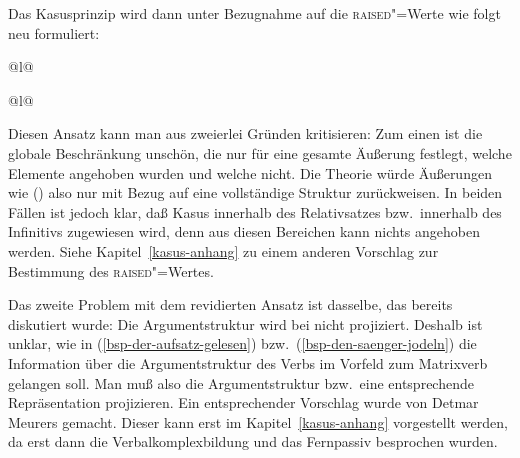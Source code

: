 Das Kasusprinzip wird dann unter Bezugnahme auf die \textsc{raised}"=Werte wie folgt neu formuliert:
\eal
\label{case-prz-zwei}
\ex \begin{tabular}[t]{@{}l@{}}
     \impl \\
    \mbox{}\hspace{3cm}
    \end{tabular}
\ex \begin{tabular}[t]{@{}l@{}}
     \impl \\
    \mbox{}\hspace{3cm}
    \end{tabular}
\zl
Diesen Ansatz kann man aus zweierlei Gründen kritisieren: Zum einen ist die globale Beschränkung
unschön, die nur für eine gesamte Äußerung festlegt, welche Elemente angehoben wurden und welche nicht.
Die Theorie würde Äußerungen wie () also nur mit Bezug auf eine vollständige Struktur zurückweisen.
\eal
{}
\zl
In beiden Fällen ist jedoch klar, daß Kasus innerhalb des Relativsatzes bzw.\
innerhalb des Infinitivs zugewiesen wird, denn aus diesen Bereichen kann nichts angehoben werden. 
Siehe Kapitel~\ref{kasus-anhang} zu einem anderen Vorschlag zur Bestimmung des \textsc{raised}"=Wertes.

Das zweite Problem mit dem revidierten Ansatz ist dasselbe, das bereits diskutiert
wurde: Die Argumentstruktur wird bei \prz nicht projiziert. Deshalb ist
unklar, wie in (\ref{bsp-der-aufsatz-gelesen}) bzw.\ (\ref{bsp-den-saenger-jodeln})
die Information über die Argumentstruktur des Verbs im Vorfeld zum
Matrixverb gelangen soll. Man muß also die Argumentstruktur bzw.\ eine entsprechende
Repräsentation projizieren. Ein entsprechender Vorschlag wurde von Detmar Meurers gemacht.
Dieser kann erst im Kapitel~\ref{kasus-anhang} vorgestellt werden, da erst dann 
die Verbalkomplexbildung und das Fernpassiv besprochen wurden.




